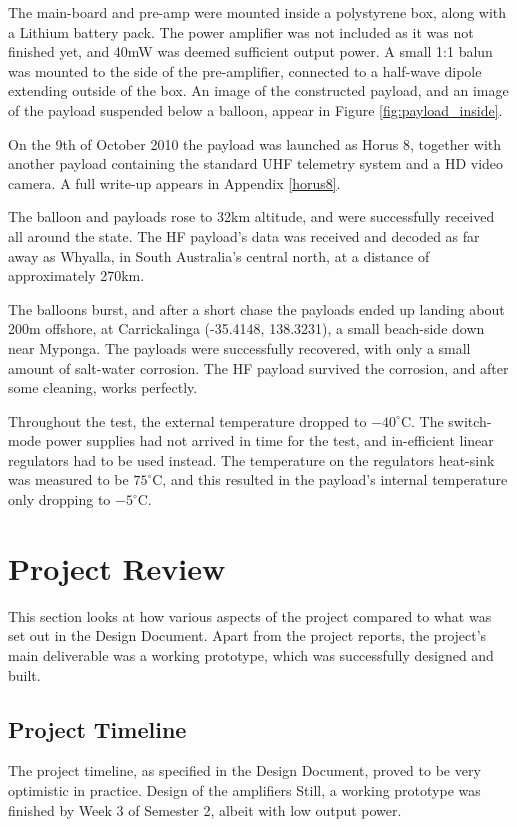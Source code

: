 \documentclass[a4paper,12pt]{article}
\begin{document}
The main-board and pre-amp were mounted inside a polystyrene box, along with a Lithium battery pack. The power amplifier was not included as it was not finished yet, and 40mW was deemed sufficient output power.  A small 1:1 balun was mounted to the side of the pre-amplifier, connected to a half-wave dipole extending outside of the box. An image of the constructed payload, and an image of the payload suspended below a balloon, appear in Figure \ref{fig:payload_inside}.

On the 9th of October 2010 the payload was launched as Horus 8, together with another payload containing the standard UHF telemetry system and a HD video camera. A full write-up appears in Appendix \ref{horus8}. 

The balloon and payloads rose to 32km altitude, and were successfully received all around the state. The HF payload's data was received and decoded as far away as Whyalla, in South Australia's central north, at a distance of approximately 270km. 

The balloons burst, and after a short chase the payloads ended up landing about 200m offshore, at Carrickalinga (-35.4148, 138.3231), a small beach-side down near Myponga. The payloads were successfully recovered, with only a small amount of salt-water corrosion. The HF payload survived the corrosion, and after some cleaning, works perfectly.

Throughout the test, the external temperature dropped to $-40^\circ$C. The switch-mode power supplies had not arrived in time for the test, and in-efficient linear regulators had to be used instead. The temperature on the regulators heat-sink was measured to be $75^\circ$C, and this resulted in the payload's internal temperature only dropping to $-5^\circ$C.


\section{Project Review}
This section looks at how various aspects of the project compared to what was set out in the Design Document\citep{ref:designdoc}. Apart from the project reports, the project's main deliverable was a working prototype, which was successfully designed and built.

\subsection{Project Timeline}
The project timeline, as specified in the Design Document, proved to be very optimistic in practice. Design of the amplifiers  Still, a working prototype was finished by Week 3 of Semester 2, albeit with low output power.
\end{document}
